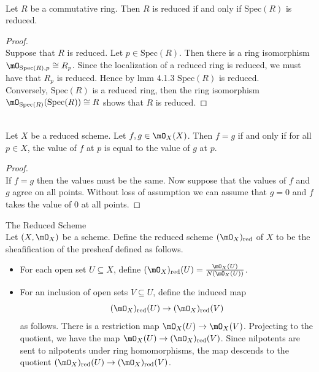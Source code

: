 \documentclass[a4paper]{article}
\begin{document}
\begin{lmm}{}{}\\
Let $R$ be a commutative ring. Then $R$ is reduced if and only if $\text{Spec}(R)$ is reduced. 
\begin{proof}\\
Suppose that $R$ is reduced. Let $p\in\text{Spec}(R)$. Then there is a ring isomorphism $\mO_{\text{Spec}(R),p}\cong R_p$. Since the localization of a reduced ring is reduced, we must have that $R_p$ is reduced. Hence by lmm 4.1.3 $\text{Spec}(R)$ is reduced. \\

Conversely, $\text{Spec}(R)$ is a reduced ring, then the ring isomorphism $\mO_{\text{Spec}(R)}(\text{Spec}(R))\cong R$ shows that $R$ is reduced. 
\end{proof}
\end{lmm}

\begin{lmm}{}{}\\
Let $X$ be a reduced scheme. Let $f,g\in\mO_X(X)$. Then $f=g$ if and only if for all $p\in X$, the value of $f$ at $p$ is equal to the value of $g$ at $p$. 
\begin{proof}\\
If $f=g$ then the values must be the same. Now suppose that the values of $f$ and $g$ agree on all points. Without loss of assumption we can assume that $g=0$ and $f$ takes the value of $0$ at all points. 
\end{proof}
\end{lmm}

\begin{defn}{The Reduced Scheme}{}\\
Let $(X,\mO_X)$ be a scheme. Define the reduced scheme $(\mO_X)_\text{red}$ of $X$ to be the sheafification of the presheaf defined as follows. 
\begin{itemize}
\item For each open set $U\subseteq X$, define $(\mO_X)_\text{red}(U)=\frac{\mO_X(U)}{N(\mO_X(U))}$. 
\item For an inclusion of open sets $V\subseteq U$, define the induced map $$(\mO_X)_\text{red}(U)\to(\mO_X)_\text{red}(V)$$ as follows. There is a restriction map $\mO_X(U)\to\mO_X(V)$. Projecting to the quotient, we have the map $\mO_X(U)\to(\mO_X)_\text{red}(V)$. Since nilpotents are sent to nilpotents under ring homomorphisms, the map descends to the quotient $(\mO_X)_\text{red}(U)\to(\mO_X)_\text{red}(V)$. 
\end{itemize}
\end{defn}
\end{document}
